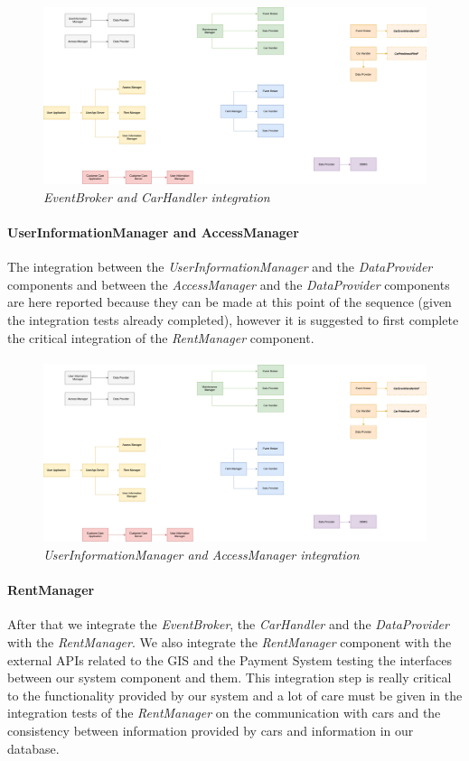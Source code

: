 \paragraph{}
		
		\begin{figure}[h]
			\centering
			\includegraphics[width=0.6\linewidth]{img/Integration2a}
			\caption{
				\label{fig:eventBrokerCarHandler} 
				\emph{EventBroker and CarHandler integration}
			}
		\end{figure}

\clearpage
\paragraph{UserInformationManager and AccessManager} 
The integration between the \emph{UserInformationManager} and the \emph{DataProvider} components and between the \emph{AccessManager} and the \emph{DataProvider} components are here reported because they can be made at this point of the sequence (given the integration tests already completed), however it is suggested to first complete the critical integration of the \emph{RentManager} component. \\
\paragraph{}
		
		\begin{figure}[h]
			\centering
			\includegraphics[width=0.5\linewidth]{img/Integration2b}
			\caption{
				\label{fig:userInfoAccessManager} 
				\emph{UserInformationManager and AccessManager integration}
			}
		\end{figure}
		
\paragraph{RentManager} 
After that we integrate the \emph{EventBroker}, the \emph{CarHandler} and the \emph{DataProvider} with the \emph{RentManager}. We also integrate the \emph{RentManager} component with the external APIs related to the GIS and the Payment System testing the interfaces between our system component and them. This integration step is really critical to the functionality provided by our system and a lot of care must be given in the integration tests of the \emph{RentManager} on the communication with cars and the consistency between information provided by cars and information in our database.  \\
